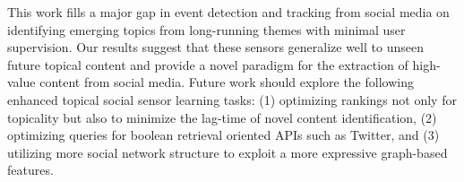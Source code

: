This work fills a major gap in 
event detection and tracking from social media
on identifying emerging topics from long-running themes with
minimal user supervision.  Our results suggest that these
sensors generalize well to unseen future topical content and provide a
novel paradigm for the extraction of high-value content from social
media.  Future work should explore the following enhanced topical
social sensor learning tasks: (1) optimizing rankings not only for topicality
but also to minimize the lag-time of novel content identification, (2) optimizing
queries for boolean retrieval oriented APIs such as Twitter, and (3) utilizing 
more social network structure to exploit a more expressive graph-based features.

